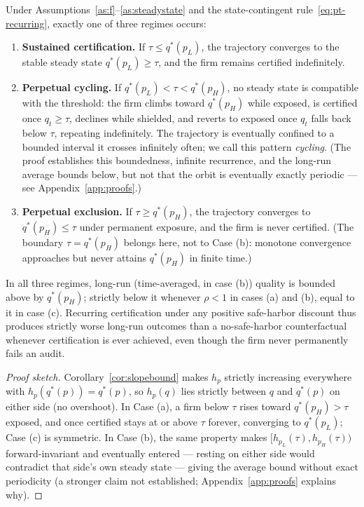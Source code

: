 \begin{mainthm}
Under Assumptions~\ref{as:f}--\ref{as:steadystate} and the state-contingent rule~\eqref{eq:pt-recurring}, exactly one of three regimes occurs:
\begin{enumerate}
\item[(a)] \textbf{Sustained certification.} If $\tau \leq q^*(p_L)$, the trajectory converges to the stable steady state $q^*(p_L) \geq \tau$, and the firm remains certified indefinitely.
\item[(b)] \textbf{Perpetual cycling.} If $q^*(p_L) < \tau < q^*(p_H)$, no steady state is compatible with the threshold: the firm climbs toward $q^*(p_H)$ while exposed, is certified once $q_t \geq \tau$, declines while shielded, and reverts to exposed once $q_t$ falls back below $\tau$, repeating indefinitely. The trajectory is eventually confined to a bounded interval it crosses infinitely often; we call this pattern \emph{cycling}. (The proof establishes this boundedness, infinite recurrence, and the long-run average bounds below, but not that the orbit is eventually exactly periodic — see Appendix~\ref{app:proofs}.)
\item[(c)] \textbf{Perpetual exclusion.} If $\tau \geq q^*(p_H)$, the trajectory converges to $q^*(p_H) \leq \tau$ under permanent exposure, and the firm is never certified. (The boundary $\tau=q^*(p_H)$ belongs here, not to Case (b): monotone convergence approaches but never attains $q^*(p_H)$ in finite time.)
\end{enumerate}
In all three regimes, long-run (time-averaged, in case (b)) quality is bounded above by $q^*(p_H)$; strictly below it whenever $\rho<1$ in cases (a) and (b), equal to it in case (c). Recurring certification under any positive safe-harbor discount thus produces strictly worse long-run outcomes than a no-safe-harbor counterfactual whenever certification is ever achieved, even though the firm never permanently fails an audit.
\label{prop:recurring}
\end{mainthm}

\begin{proof}[Proof sketch]
Corollary~\ref{cor:slopebound} makes $h_p$ strictly increasing everywhere with $h_p(q^*(p))=q^*(p)$, so $h_p(q)$ lies strictly between $q$ and $q^*(p)$ on either side (no overshoot). In Case (a), a firm below $\tau$ rises toward $q^*(p_H)>\tau$ exposed, and once certified stays at or above $\tau$ forever, converging to $q^*(p_L)$; Case (c) is symmetric. In Case (b), the same property makes $[h_{p_L}(\tau),h_{p_H}(\tau))$ forward-invariant and eventually entered — resting on either side would contradict that side's own steady state — giving the average bound without exact periodicity (a stronger claim not established; Appendix~\ref{app:proofs} explains why).
\end{proof}

